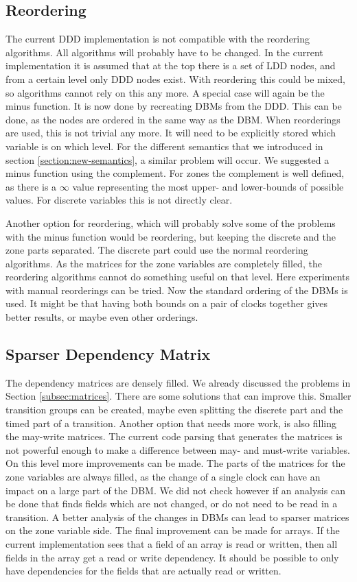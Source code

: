 \subsection{Reordering}
The current DDD implementation is not compatible with the reordering algorithms. All algorithms will probably have to be changed. In the current implementation it is assumed that at the top there is a set of LDD nodes, and from a certain level only DDD nodes exist. With reordering this could be mixed, so algorithms cannot rely on this any more. A special case will again be the minus function. It is now done by recreating DBMs from the DDD. This can be done, as the nodes are ordered in the same way as the DBM. When reorderings are used, this is not trivial any more. It will need to be explicitly stored which variable is on which level. For the different semantics that we introduced in section \ref{section:new-semantics}, a similar problem will occur. We suggested a minus function using the complement. For zones the complement is well defined, as there is a $\infty$ value representing the most upper- and lower-bounds of possible values. For discrete variables this is not directly clear.
 
Another option for reordering, which will probably solve some of the problems with the minus function would be reordering, but keeping the discrete and the zone parts separated. The discrete part could use the normal reordering algorithms. As the matrices for the zone variables are completely filled, the reordering algorithms cannot do something useful on that level. Here experiments with manual reorderings can be tried. Now the standard ordering of the DBMs is used. It might be that having both bounds on a pair of clocks together gives better results, or maybe even other orderings.

\subsection{Sparser Dependency Matrix}
The dependency matrices are densely filled. We already discussed the problems in Section \ref{subsec:matrices}. There are some solutions that can improve this. Smaller transition groups can be created, maybe even splitting the discrete part and the timed part of a transition. Another option that needs more work, is also filling the may-write matrices. The current code parsing that generates the matrices is not powerful enough to make a difference between may- and must-write variables. On this level more improvements can be made. The parts of the matrices for the zone variables are always filled, as the change of a single clock can have an impact on a large part of the DBM. We did not check however if an analysis can be done that finds fields which are not changed, or do not need to be read in a transition. A better analysis of the changes in DBMs can lead to sparser matrices on the zone variable side. The final improvement can be made for arrays. If the current implementation sees that a field of an array is read or written, then all fields in the array get a read or write dependency. It should be possible to only have dependencies for the fields that are actually read or written.


